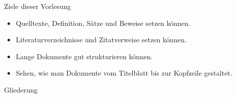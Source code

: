 
\begin{frame}{Ziele dieser Vorlesung}
  \begin{itemize}
    \item Quelltexte, Definition, Sätze und Beweise setzen können.
    \item Literaturverzeichnisse und Zitatverweise setzen können.
    \item Lange Dokumente gut strukturieren können.
    \item Sehen, wie man Dokumente vom Titelblatt bis zur Kopfzeile gestaltet.
  \end{itemize}
\end{frame}


\begin{frame}{Gliederung}
  \tableofcontents
\end{frame}
